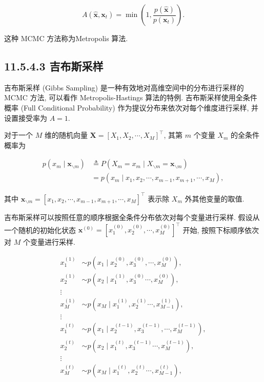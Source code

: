 \documentclass[10pt]{article}
\begin{document}
\begin{equation*}
A\left(\hat{\boldsymbol{x}}, \boldsymbol{x}_{t}\right)=\min \left(1, \frac{p(\hat{\boldsymbol{x}})}{p\left(\boldsymbol{x}_{t}\right)}\right) . \tag{11.115}
\end{equation*}


这种 MCMC 方法称为Metropolis 算法.

\subsection*{11.5.4.3 吉布斯采样}
吉布斯采样 (Gibbs Sampling) 是一种有效地对高维空间中的分布进行采样的 MCMC 方法, 可以看作 Metropolis-Hastings 算法的特例. 吉布斯采样使用全条件概率 (Full Conditional Probability) 作为提议分布来依次对每个维度进行采样, 并设置接受率为 $A=1$.

对于一个 $M$ 维的随机向量 $\boldsymbol{X}=\left[X_{1}, X_{2}, \cdots, X_{M}\right]^{\top}$, 其第 $m$ 个变量 $X_{m}$ 的全条件概率为


\begin{align*}
p\left(x_{m} \mid \boldsymbol{x}_{\backslash m}\right) & \triangleq P\left(X_{m}=x_{m} \mid X_{\backslash m}=\boldsymbol{x}_{\backslash m}\right)  \tag{11.116}\\
& =p\left(x_{m} \mid x_{1}, x_{2}, \cdots, x_{m-1}, x_{m+1}, \cdots, x_{M}\right), \tag{11.117}
\end{align*}


其中 $\boldsymbol{x}_{\backslash m}=\left[x_{1}, x_{2}, \cdots, x_{m-1}, x_{m+1}, \cdots, x_{M}\right]^{\top}$ 表示除 $X_{m}$ 外其他变量的取值.

吉布斯采样可以按照任意的顺序根据全条件分布依次对每个变量进行采样. 假设从一个随机的初始化状态 $\boldsymbol{x}^{(0)}=\left[x_{1}^{(0)}, x_{2}^{(0)}, \cdots, x_{M}^{(0)}\right]^{\top}$ 开始, 按照下标顺序依次对 $M$ 个变量进行采样.


\begin{align*}
x_{1}^{(1)} & \sim p\left(x_{1} \mid x_{2}^{(0)}, x_{3}^{(0)}, \cdots, x_{M}^{(0)}\right),  \tag{11.118}\\
x_{2}^{(1)} & \sim p\left(x_{2} \mid x_{1}^{(1)}, x_{3}^{(0)} \cdots, x_{M}^{(0)}\right),  \tag{11.119}\\
\vdots &  \tag{11.120}\\
x_{M}^{(1)} & \sim p\left(x_{M} \mid x_{1}^{(1)}, x_{2}^{(1)} \cdots, x_{M-1}^{(1)}\right),  \tag{11.121}\\
\vdots &  \tag{11.122}\\
x_{1}^{(t)} & \sim p\left(x_{1} \mid x_{2}^{(t-1)}, x_{3}^{(t-1)}, \cdots, x_{M}^{(t-1)}\right),  \tag{11.123}\\
x_{2}^{(t)} & \sim p\left(x_{2} \mid x_{1}^{(t)}, x_{3}^{(t-1)} \cdots, x_{M}^{(t-1)}\right), \\
\vdots & \\
x_{M}^{(t)} & \sim p\left(x_{M} \mid x_{1}^{(t)}, x_{2}^{(t)} \cdots, x_{M-1}^{(t)}\right),
\end{align*}
\end{document}
